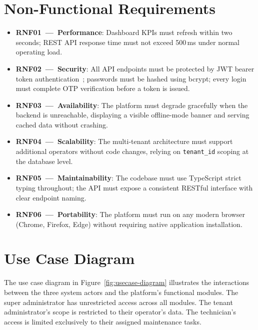 \documentclass[12pt,a4paper]{report}
\begin{document}
\section{Non-Functional Requirements}

\begin{itemize}
  \item \textbf{RNF01~---~Performance}: Dashboard KPIs must refresh within two seconds; REST
        API response time must not exceed 500\,ms under normal operating load.
  \item \textbf{RNF02~---~Security}: All API endpoints must be protected by JWT bearer token
        authentication~\autocite{rfc7519}; passwords must be hashed using bcrypt; every login must
        complete OTP verification before a token is issued.
  \item \textbf{RNF03~---~Availability}: The platform must degrade gracefully when the backend
        is unreachable, displaying a visible offline-mode banner and serving cached data without
        crashing.
  \item \textbf{RNF04~---~Scalability}: The multi-tenant architecture must support additional
        operators without code changes, relying on \texttt{tenant\_id} scoping at the database
        level.
  \item \textbf{RNF05~---~Maintainability}: The codebase must use TypeScript strict typing
        throughout; the API must expose a consistent RESTful interface with clear endpoint naming.
  \item \textbf{RNF06~---~Portability}: The platform must run on any modern browser (Chrome,
        Firefox, Edge) without requiring native application installation.
\end{itemize}

\section{Use Case Diagram}

The use case diagram in Figure~\ref{fig:usecase-diagram} illustrates the interactions between
the three system actors and the platform's functional modules. The super administrator has
unrestricted access across all modules. The tenant administrator's scope is restricted to their
operator's data. The technician's access is limited exclusively to their assigned maintenance
tasks.
\end{document}
